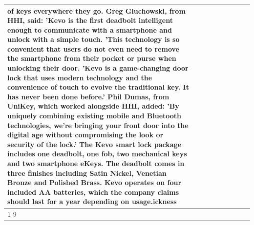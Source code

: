\begin{table}[H]
\begin{tabular}{lllrlllll}
of keys everywhere they go. Greg Gluchowski, from HHI, said: 'Kevo is the first deadbolt intelligent enough to communicate with a smartphone and unlock with a simple touch. 'This technology is so convenient that users do not even need to remove the smartphone from their pocket or purse when unlocking their door. 'Kevo is a game-changing door lock that uses modern technology and the convenience of touch to evolve the traditional key. It has never been done before.' Phil Dumas, from UniKey, which worked alongside HHI, added: 'By uniquely combining existing mobile and Bluetooth technologies, we’re bringing your front door into the digital age without compromising the look or security of the lock.' The Kevo smart lock package includes one deadbolt, one fob, two mechanical keys and two smartphone eKeys. The deadbolt comes in three finishes including Satin Nickel, Venetian Bronze and Polished Brass. Kevo operates on four included AA batteries, which the company claims should last for a year depending on usage.ickness \\
\cline{1-9}

\end{tabular}
\end{table}
